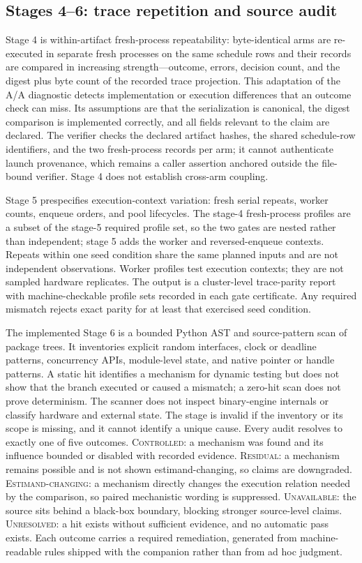 \documentclass[aps,reprint,superscriptaddress,longbibliography,floatfix]{revtex4-2}
\begin{document}
\subsection{Stages 4--6: trace repetition and source audit}

Stage 4 is within-artifact fresh-process repeatability: byte-identical arms
are re-executed in separate fresh processes on the same schedule rows and their
records are compared in increasing strength---outcome, errors, decision count,
and the digest plus byte count of the recorded trace projection.  This
adaptation of the A/A diagnostic detects implementation or execution
differences that an outcome check can miss.  Its assumptions are that the
serialization is canonical, the digest comparison is implemented correctly, and
all fields relevant to the claim are declared.  The verifier checks the
declared artifact hashes, the shared schedule-row identifiers, and the two
fresh-process records per arm; it cannot authenticate launch provenance, which
remains a caller assertion anchored outside the file-bound verifier.  Stage 4
does not establish cross-arm coupling.

Stage 5 prespecifies execution-context variation: fresh serial repeats,
worker counts, enqueue orders, and pool lifecycles.  The stage-4 fresh-process
profiles are a subset of the stage-5 required profile set, so the two gates are
nested rather than independent; stage 5 adds the worker and reversed-enqueue
contexts.  Repeats within one seed condition share the same planned inputs and
are not independent observations.  Worker profiles test execution
contexts; they are not sampled hardware replicates.  The output is a
cluster-level trace-parity report with machine-checkable profile sets recorded
in each gate certificate.  Any required mismatch rejects exact parity
for at least that exercised seed condition.

The implemented Stage 6 is a bounded Python AST and source-pattern scan of
package trees.  It inventories explicit random interfaces, clock or deadline
patterns, concurrency APIs, module-level state, and native pointer or handle
patterns.  A static hit identifies a mechanism for dynamic testing but does not
show that the branch executed or caused a mismatch; a zero-hit scan does not
prove determinism.  The scanner does not inspect binary-engine internals or
classify hardware and external state.  The stage is invalid if the inventory or
its scope is missing, and it cannot identify a unique cause.  Every audit
resolves to exactly one of five outcomes.
\textsc{Controlled}: a mechanism was found and its influence bounded or
disabled with recorded evidence.
\textsc{Residual}: a mechanism remains possible and is not shown
estimand-changing, so claims are downgraded.
\textsc{Estimand-changing}: a mechanism directly changes the execution
relation needed by the comparison, so paired mechanistic wording is suppressed.
\textsc{Unavailable}: the source sits behind a black-box boundary, blocking
stronger source-level claims.
\textsc{Unresolved}: a hit exists without sufficient evidence, and no
automatic pass exists.
Each outcome carries a required remediation, generated from machine-readable
rules shipped with the companion rather than from ad hoc judgment.
\end{document}
